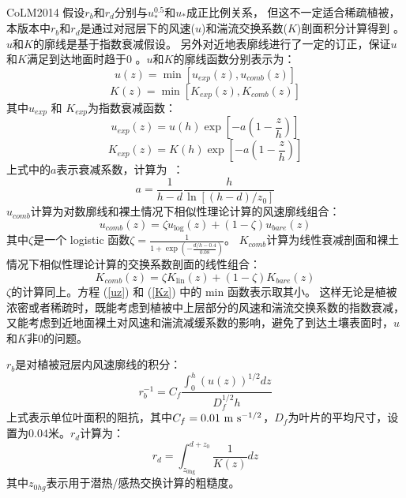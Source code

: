 CoLM2014 假设$r_b$和$r_d$分别与$u_\ast^{0.5}$和$u_\ast$成正比例关系，
但这不一定适合稀疏植被，本版本中$r_b$和$r_d$是通过对冠层下的风速($u$)和湍流交换系数($K$)剖面积分计算得到 \citep{dai2019different}。
$u$和$K$的廓线是基于指数衰减假设\citep{inoue1963turbulent,cowan1968mass}。
另外对近地表廓线进行了一定的订正，保证$u$和$K$满足到达地面时趋于0 \citep{dai2019different}。$u$和$K$的廓线函数分别表示为：
\begin{equation}\label{uz}
u(z)=\min \left[u_{exp}(z), u_{comb}(z)\right]
\end{equation}
\begin{equation}\label{Kz}
K(z)=\min \left[K_{exp}(z), K_{comb}(z)\right]
\end{equation}
其中$u_{exp}$ 和 $K_{exp}$为指数衰减函数：
\begin{equation}
u_{exp}(z)=u(h) \exp \left[-a\left(1-\frac{z}{h}\right)\right]
\end{equation}
\begin{equation}
K_{exp}(z)=K(h) \exp \left[-a\left(1-\frac{z}{h}\right)\right]
\end{equation}
上式中的$a$表示衰减系数，计算为~\citep{inoue1963turbulent,cowan1968mass,kondo1971relationship}：
\begin{equation}
a=\frac{1}{h-d} \frac{h}{\ln \left[(h-d) / z_{0}\right]}
\end{equation}
$u_{comb}$计算为对数廓线和裸土情况下相似性理论计算的风速廓线组合：
\begin{equation}\label{ucomb}
u_{comb}(z)=\zeta u_{\log }(z)+(1-\zeta) u_{{bare }}(z)
\end{equation}
其中$\zeta$是一个 logistic 函数$\zeta=\frac{1}{1+\exp{\left(-\frac{d/h-0.4}{0.08}\right)}}$。
$K_{comb}$计算为线性衰减剖面和裸土情况下相似性理论计算的交换系数剖面的线性组合：
\begin{equation}\label{kcomb}
K_{comb}(z)=\zeta K_{\mathrm{lin}}(z)+(1-\zeta) K_{bare}(z)
\end{equation}
$\zeta$的计算同上。方程 (\ref{uz}) 和 (\ref{Kz}) 中的 min 函数表示取其小。
这样无论是植被浓密或者稀疏时，既能考虑到植被中上层部分的风速和湍流交换系数的指数衰减，
又能考虑到近地面裸土对风速和湍流减缓系数的影响，避免了到达土壤表面时，$u$和$K$非0的问题。


$r_b$是对植被冠层内风速廓线的积分：
\begin{equation}
r_{b}^{-1}=C_{f} \frac{\int_{0}^{h}(u(z))^{1 / 2} d z}{D_{f}^{1 / 2} h}
\end{equation}
上式表示单位叶面积的阻抗，其中$C_f=0.01\ \rm m\ s^{-1/2}$，$D_f$为叶片的平均尺寸，设置为0.04米。$r_d$计算为：
\begin{equation}\label{r_d1}
r_{d}=\int_{z_{0 \mathrm{hg}}}^{d+z_{0}} \frac{1}{K(z)} d z
\end{equation}
其中$z_{0hg}$表示用于潜热/感热交换计算的粗糙度\citep{zeng1998effect}。


